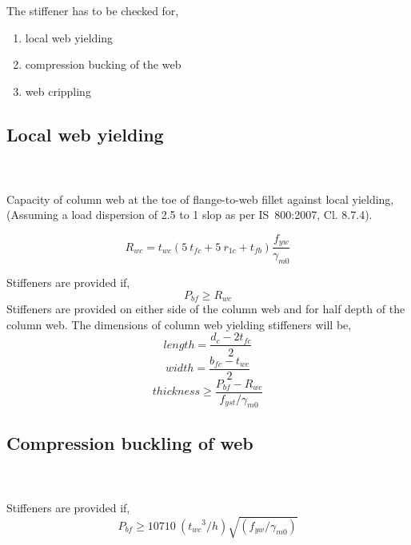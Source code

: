 \documentclass[11.5pt,a4paper,oneside]{report}
\begin{document}
\begin{Form}
The stiffener has to be checked for, 
\begin{enumerate}[label=(\alph*)]
	\item local web yielding
	\item compression bucking of the web
	\item web crippling
\end{enumerate}


\subsection{Local web yielding}
\qquad {} \\ \\
Capacity of column web at the toe of flange-to-web fillet against local yielding,
(Assuming a load dispersion of 2.5 to 1 slop as per IS~800:2007, Cl. 8.7.4).

\begin{equation}
	R_{wc} = t_{wc}(5~t_{fc} + 5~r_{1c} + t_{fb}) \frac{f_{yw}}{\gamma_{m0}}
\end{equation}

Stiffeners are provided if,
\begin{equation}
	P_{bf} \geq  R_{wc}
\end{equation}
Stiffeners are provided on either side of the column web and for half depth of the column web.
The dimensions of column web yielding stiffeners will be, \\
\begin{equation}
	length = \frac{d_c-2t_{fc}}{2}
\end{equation}
\begin{equation}
	width = \frac{b_{fc}-t_{wc}}{2}
\end{equation}
\begin{equation}
	thickness \ge \frac{P_{bf}-R_{wc}}{f_{yst}/\gamma_{m0}}
\end{equation}

\subsection{Compression buckling of web}
\qquad {} \\ \\

Stiffeners are provided if,
\begin{equation}
	P_{bf} \geq  10710~({t_{wc}}^3 /h) \sqrt{(f_{yw}/ \gamma_{m0})}
\end{equation}




\end{Form}
\end{document}
